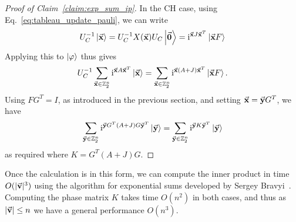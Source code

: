 \begin{proof}[Proof of Claim~\ref{claim:exp_sum_ip}]
In the CH case, using Eq.~\ref{eq:tableau_update_pauli}, we can write
\[U_{C}^{-1}\ket{\va{x}}=U_{C}^{-1}X(\va{x})U_{C}\ket{\va{0}}=\mathrm{i}^{\va{x}J\va{x}^{T}}\ket{\va{x}F}\]
Applying this to $\ket{\varphi}$ thus gives
\[U_{C}^{-1}\sum_{\va{x}\in\mathbb{Z}_{2}^{n}}\mathrm{i}^{\va{x}A\va{x}^{T}}\ket{\va{x}}=\sum_{\va{x}\in\mathbb{Z}_{2}^{n}}\mathrm{i}^{\va{x}(A+J)\va{x}^{T}}\ket{\va{x}F}.\]
Using $FG^{T}=I$, as introduced in the previous section, and setting $\va{x}=\va{y}G^{T}$, we have
\[\sum_{\va{y}\in\mathbb{Z}_{2}^{n}}\mathrm{i}^{\va{y}G^{T}(A+J)G\va{y}^{T}}\ket{\va{y}}=\sum_{\va{y}\in\mathbb{Z}_{2}^{n}}\mathrm{i}^{\va{y}K\va{y}^{T}}\ket{\va{y}}\]
as required where $K=G^{T}(A+J)G$.
\end{proof}
Once the calculation is in this form, we can compute the inner product in time $O(\vert \va{v}\vert^{3})$ using the algorithm for exponential sums developed by Sergey Bravyi~\cite{Bravyi2018}. Computing the phase matrix $K$ takes time $O(n^{2})$ in both cases, and thus as $\vert \va{v}\vert\leq n$ we have a general performance $O(n^{3})$.

